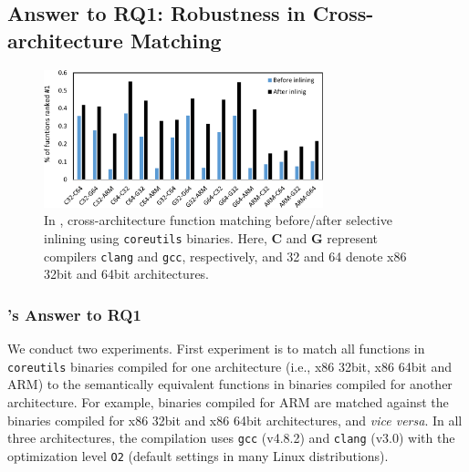 \subsection{Answer to RQ1: Robustness in Cross-architecture Matching}\label{sec:evaluation_rq1}

\begin{figure}[t]
\begin{center}%
\includegraphics[height=4cm]{srj-figures/srj-cross-archi.pdf} %
\caption{In \tool, cross-architecture function matching before/after selective inlining using \texttt{coreutils} binaries. Here, \textbf{C} and \textbf{G} represent  compilers \texttt{clang} and \texttt{gcc}, respectively, and 32 and 64 denote x86 32bit and 64bit architectures. }
\label{fig:cross-archi}

\end{center}
\end{figure}


\subsubsection{\tool's Answer to RQ1}\label{sec:evaluation_rq1.1}
We conduct two experiments. First experiment is to match all functions in \texttt{coreutils} binaries compiled for one architecture (i.e., x86 32bit, x86 64bit and ARM) to the semantically equivalent functions in binaries compiled for another architecture. For example, binaries compiled for ARM are matched against the binaries compiled for x86 32bit and x86 64bit architectures, and \emph{vice versa}.  In all three architectures, the compilation uses \texttt{gcc} (v4.8.2) and \texttt{clang} (v3.0) with the optimization level \texttt{O2} (default settings in many Linux distributions).

